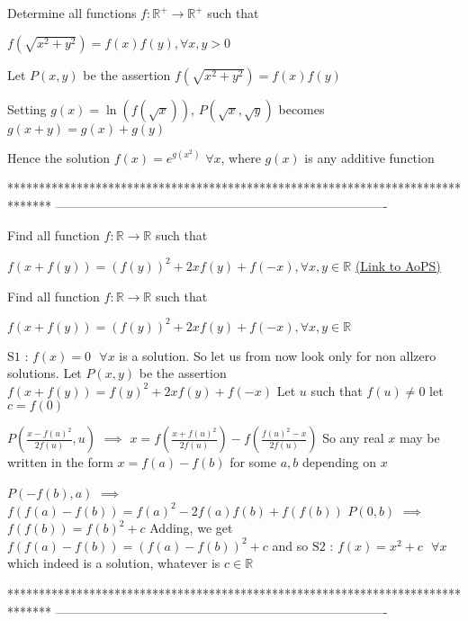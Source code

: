 \begin{solution}
	\begin{tcolorbox}Determine all functions $f : \mathbb{R}^+ \to \mathbb{R}^+$ such that 

$f\left ( \sqrt{x^{2}+y^{2}} \right )=f\left ( x \right )f\left ( y \right ),\forall x,y> 0$\end{tcolorbox}
Let $P(x,y)$ be the assertion $f(\sqrt{x^2+y^2})=f(x)f(y)$

Setting $g(x)=\ln(f(\sqrt x))$, $P(\sqrt x,\sqrt y)$ becomes $g(x+y)=g(x)+g(y)$

Hence the solution $\boxed{f(x)=e^{g(x^2)}}$ $\forall x$, where $g(x)$ is any additive function
\end{solution}
*******************************************************************************
-------------------------------------------------------------------------------

\begin{problem}
	Find all function $f : \mathbb{R} \to \mathbb{R}$ such that 

$   f\left ( x+f\left ( y \right ) \right )=\left ( f\left ( y \right ) \right )^{2}+2xf\left ( y \right )+f\left ( -x \right )                                                                                         ,\forall x,y\in \mathbb{R}$
	\flushright \href{https://artofproblemsolving.com/community/c6h616963}{(Link to AoPS)}
\end{problem}



\begin{solution}
	\begin{tcolorbox}Find all function $f : \mathbb{R} \to \mathbb{R}$ such that 

$   f\left ( x+f\left ( y \right ) \right )=\left ( f\left ( y \right ) \right )^{2}+2xf\left ( y \right )+f\left ( -x \right )                                                                                         ,\forall x,y\in \mathbb{R}$\end{tcolorbox}
$\boxed{\text{S1 : }f(x)=0\text{  }\forall x}$ is a solution. So let us from now look only for non allzero solutions.
Let $P(x,y)$ be the assertion $f(x+f(y))=f(y)^2+2xf(y)+f(-x)$
Let $u$ such that $f(u)\ne 0$
let $c=f(0)$

$P(\frac{x-f(u)^2}{2f(u)},u)$ $\implies$ $x=f(\frac{x+f(u)^2}{2f(u)})-f(\frac{f(u)^2-x}{2f(u)})$
So any real $x$ may be written in the form $x=f(a)-f(b)$ for some $a,b$ depending on $x$

$P(-f(b),a)$ $\implies$ $f(f(a)-f(b))=f(a)^2-2f(a)f(b)+f(f(b))$
$P(0,b)$ $\implies$ $f(f(b))=f(b)^2+c$
Adding, we get $f(f(a)-f(b))=(f(a)-f(b))^2+c$ and so $\boxed{\text{S2 : }f(x)=x^2+c\text{  }\forall x}$ which indeed is a solution, whatever is $c\in\mathbb R$
\end{solution}
*******************************************************************************
-------------------------------------------------------------------------------

